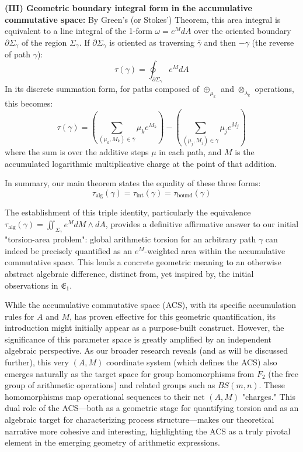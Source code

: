 \textbf{(III) Geometric boundary integral form in the accumulative commutative space:}
By Green's (or Stokes') Theorem, this area integral is equivalent to a line integral of the 1-form $\omega = e^M dA$ over the oriented boundary $\partial \Sigma_\gamma$ of the region $\Sigma_\gamma$. If $\partial \Sigma_\gamma$ is oriented as traversing $\bar{\gamma}$ and then $-\gamma$ (the reverse of path $\gamma$):
\[ \tau(\gamma) = \oint_{\partial \Sigma_\gamma} e^M dA \]
In its discrete summation form, for paths composed of $\oplus_{\mu_k}$ and $\otimes_{\lambda_k}$ operations, this becomes:
\[ \tau(\gamma) = \left(\sum_{(\mu_k, M_k) \in \bar{\gamma}} \mu_k e^{M_k}\right) - \left(\sum_{(\mu_j, M_j) \in \gamma} \mu_j e^{M_j}\right) \]
where the sum is over the additive steps $\mu$ in each path, and $M$ is the accumulated logarithmic multiplicative charge at the point of that addition.

In summary, our main theorem states the equality of these three forms:
\begin{equation}
\tau_{\text{alg}}(\gamma) = \tau_{\text{int}}(\gamma) = \tau_{\text{bound}}(\gamma)
\label{eq:triple_identity_final_narrative_enhanced_acs_AM_lc}
\end{equation}

The establishment of this triple identity, particularly the equivalence $\tau_{\text{alg}}(\gamma) = \iint_{\Sigma_\gamma} e^M dM \wedge dA$, provides a definitive affirmative answer to our initial "torsion-area problem": global arithmetic torsion for an arbitrary path $\gamma$ can indeed be precisely quantified as an $e^M$-weighted area within the accumulative commutative space. This lends a concrete geometric meaning to an otherwise abstract algebraic difference, distinct from, yet inspired by, the initial observations in $\mathfrak{E}_1$.

While the accumulative commutative space (ACS), with its specific accumulation rules for $A$ and $M$, has proven effective for this geometric quantification, its introduction might initially appear as a purpose-built construct. However, the significance of this parameter space is greatly amplified by an independent algebraic perspective. As our broader research reveals (and as will be discussed further), this very $(A,M)$ coordinate system (which defines the ACS) also emerges naturally as the target space for group homomorphisms from $F_2$ (the free group of arithmetic operations) and related groups such as $BS(m,n)$. These homomorphisms map operational sequences to their net $(A,M)$ "charges." This dual role of the ACS—both as a geometric stage for quantifying torsion and as an algebraic target for characterizing process structure—makes our theoretical narrative more cohesive and interesting, highlighting the ACS as a truly pivotal element in the emerging geometry of arithmetic expressions.

